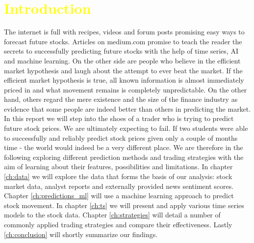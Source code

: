 \chapter{\textcolor{yellow}{Introduction}} \label{ch:Introduction}


The internet is full with recipes, videos and forum posts promising easy ways to forecast future stocks. Articles on medium.com promise to teach the reader the secrets to successfully predicting future stocks with the help of time series, AI and machine learning. On the other side are people who believe in the efficient market hypothesis and laugh about the attempt to ever beat the market. If the efficient market hypothesis is true, all known information is almost immediately priced in and what movement remains is completely unpredictable. On the other hand, others regard the mere existence and the size of the finance industry as evidence that some people are indeed better than others in predicting the market. \\

In this report we will step into the shoes of a trader who is trying to predict future stock prices. We are ultimately expecting to fail. If two students were able to successfully and reliably predict stock prices given only a couple of months time - the world would indeed be a very different place. We are therefore in the following exploring different prediction methods and trading strategies with the aim of learning about their features, possibilities and limitations. In chapter \ref{ch:data} we will explore the data that forms the basis of our analysis: stock market data, analyst reports and externally provided news sentiment scores. Chapter \ref{ch:predictions_ml} will use a machine learning approach to predict stock movement. In chapter \ref{ch:ts} we will present and apply various time series models to the stock data. Chapter \ref{ch:strategies} will detail a number of commonly applied trading strategies and compare their effectiveness. Lastly \ref{ch:conclusion} will shortly summarize our findings. 







